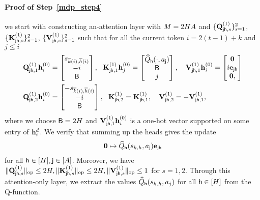  \paragraph{Proof of Step~\ref{mdp_step4}}
 we start with constructing an-attention layer with ${M}=2{H}{A}$ and $\{{\mathbf Q}_{{\mathsf{j}}{\mathsf{h}},s}^{(1)}\}^2_{s=1}$, $\{{\mathbf K}_{{\mathsf{j}}{\mathsf{h}},s}^{(1)}\}^2_{s=1}$, $\{{\mathbf V}_{{\mathsf{j}}{\mathsf{h}},s}^{(1)}\}^2_{s=1}$ such that for all the current token $i= 2(t-1)+k$ and $j\leq i$
\begin{align*}
  & {\mathbf Q}_{{\mathsf{j}}{\mathsf{h}},1}^{(1)}{\mathbf h}_i^{(0)} =\begin{bmatrix}
       {s}_{\overline{k}(i),\overline{h}(i)}\\-i\\
       {\mathsf{B}}
   \end{bmatrix},~~ {\mathbf K}_{{\mathsf{j}}{\mathsf{h}},1}^{(1)}{\mathbf h}_j^{(0)} =\begin{bmatrix}
    {\widehat{{Q}}}_{\mathsf{h}}(\cdot,{a}_{\mathsf{j}})\\  {\mathsf{B}}\\ j
   \end{bmatrix},~~~
   {\mathbf V}_{{\mathsf{j}}{\mathsf{h}},1}^{(1)}{\mathbf h}_i^{(0)} =\begin{bmatrix}
       {\mathbf 0} \\ i{\mathbf e}_{{\mathsf{j}}{\mathsf{h}}}\\
       {\mathbf 0},
   \end{bmatrix}
   \\
    &{\mathbf Q}_{{\mathsf{j}}{\mathsf{h}},2}^{(1)}{\mathbf h}_i^{(0)} =\begin{bmatrix}
       -{s}_{\overline{k}(i),\overline{h}(i)}\\-i\\
       {\mathsf{B}}
   \end{bmatrix},~~ {\mathbf K}_{{\mathsf{j}}{\mathsf{h}},2}^{(1)}={\mathbf K}_{{\mathsf{j}}{\mathsf{h}},1}^{(1)},~~~
{\mathbf V}_{{\mathsf{j}}{\mathsf{h}},2}^{(1)}=-{\mathbf V}_{{\mathsf{j}}{\mathsf{h}},1}^{(1)},
\end{align*}
where we choose ${\mathsf{B}}=2{H}$ and ${\mathbf V}_{{\mathsf{j}}{\mathsf{h}},1}^{(1)}{\mathbf h}_i^{(0)}$ is a one-hot vector supported on some entry of ${\mathbf h}_i^{d}$. We verify  that summing up the heads gives the update
\begin{align*}
    {\mathbf 0}\mapsto {\widehat{{Q}}}_{{\mathsf{h}}}({s}_{k,h},{a}_{\mathsf{j}}){\mathbf e}_{{\mathsf{j}}{\mathsf{h}}}
\end{align*}
 for all ${\mathsf{h}}\in[{H}],{\mathsf{j}}\in[{A}]$. Moreover, we have $\|{{\mathbf Q}_{{\mathsf{j}}{\mathsf{h}},s}^{(1)}}\|_{\mathrm{op}}\leq2{H},\|{{\mathbf K}_{{\mathsf{j}}{\mathsf{h}},s}^{(1)}}\|_{\mathrm{op}}\leq2{H},\|{{\mathbf V}_{{\mathsf{j}}{\mathsf{h}},s}^{(1)}}\|_{\mathrm{op}}\leq1$ for $s=1,2$. Through this attention-only layer, we extract the values ${\widehat{{Q}}}_{\mathsf{h}}({s}_{k,h},{a}_j)$ for all ${\mathsf{h}}\in[{H}]$ from the Q-function.

